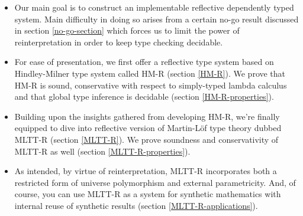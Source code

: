 \begin{itemize}
    \item Our main goal is to construct an implementable
        reflective dependently typed system. Main
        difficulty in doing so arises from a certain
        no-go result discussed in section
        \ref{no-go-section} which forces us to limit the
        power of reinterpretation in order to keep type
        checking decidable.
    \item For ease of presentation, we first offer a
        reflective type system based on Hindley-Milner
        type system called HM-R (section \ref{HM-R}).
        We prove that HM-R is sound, conservative with
        respect to simply-typed lambda calculus and that
        global type inference is decidable (section
        \ref{HM-R-properties}).
    \item Building upon the insights gathered from
        developing HM-R, we're finally equipped to dive
        into reflective version of Martin-L\"of type
        theory dubbed MLTT-R (section \ref{MLTT-R}). We
        prove soundness and conservativity of MLTT-R as
        well (section \ref{MLTT-R-properties}).
    \item As intended, by virtue of reinterpretation,
        MLTT-R incorporates both a restricted form of
        universe polymorphism and external
        parametricity. And, of course, you can use
        MLTT-R as a system for synthetic mathematics
        with internal reuse of synthetic results
        (section \ref{MLTT-R-applications}).
\end{itemize}
